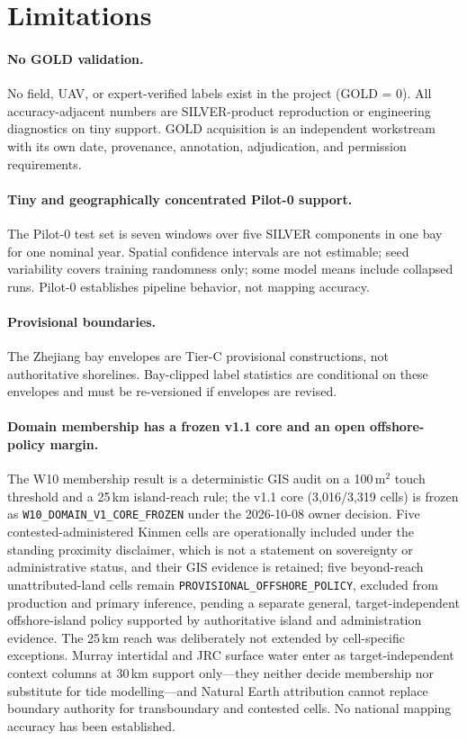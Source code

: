 \section{Limitations}\label{sec:limitations}

\paragraph{No GOLD validation.}
No field, UAV, or expert-verified labels exist in the project (GOLD
= 0). All accuracy-adjacent numbers are SILVER-product reproduction or
engineering diagnostics on tiny support. GOLD acquisition is an
independent workstream with its own date, provenance, annotation,
adjudication, and permission requirements.

\paragraph{Tiny and geographically concentrated Pilot-0 support.}
The Pilot-0 test set is seven windows over five SILVER components in one
bay for one nominal year. Spatial confidence intervals are not
estimable; seed variability covers training randomness only; some model
means include collapsed runs. Pilot-0 establishes pipeline behavior,
not mapping accuracy.

\paragraph{Provisional boundaries.}
The Zhejiang bay envelopes are Tier-C provisional constructions, not
authoritative shorelines. Bay-clipped label statistics are conditional
on these envelopes and must be re-versioned if envelopes are revised.

\paragraph{Domain membership has a frozen v1.1 core and an open offshore-policy margin.}
The W10 membership result is a deterministic GIS audit on a
100\,m$^2$ touch threshold and a 25\,km island-reach rule; the v1.1
core (3{,}016/3{,}319 cells) is frozen as
\texttt{W10\_DOMAIN\_V1\_CORE\_FROZEN} under the 2026-10-08 owner
decision. Five contested-administered Kinmen cells are operationally
included under the standing proximity disclaimer, which is not a
statement on sovereignty or administrative status, and their GIS
evidence is retained; five beyond-reach unattributed-land cells remain
\texttt{PROVISIONAL\_OFFSHORE\_POLICY}, excluded from production and
primary inference, pending a separate general, target-independent
offshore-island policy supported by authoritative island and
administration evidence. The 25\,km reach was deliberately not
extended by cell-specific exceptions. Murray intertidal and JRC surface
water enter as target-independent context columns at 30\,km support
only---they neither decide membership nor substitute for tide
modelling---and Natural Earth attribution cannot replace boundary
authority for transboundary and contested cells. No national mapping
accuracy has been established.

